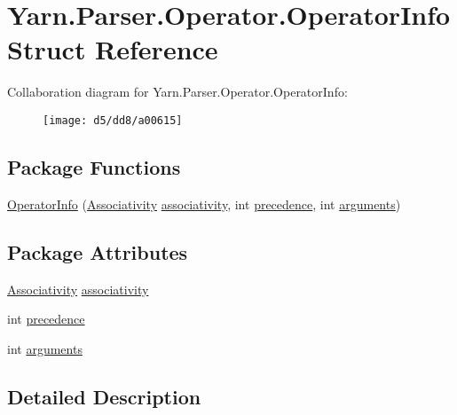 \hypertarget{a00118}{\section{Yarn.\-Parser.\-Operator.\-Operator\-Info Struct Reference}
\label{a00118}
}


Collaboration diagram for Yarn.\-Parser.\-Operator.\-Operator\-Info\-:
\nopagebreak
\begin{figure}[H]
\begin{center}
\leavevmode
\texttt{[image: d5/dd8/a00615]}
\end{center}
\end{figure}
\subsection*{Package Functions}
\begin{DoxyCompactItemize}
\item 
\hyperlink{a00118_a25faca62235c9f8542e4a071ba8ebc0b}{Operator\-Info} (\hyperlink{a00117_a83fa1b8db0e6678006920812b6f33f62}{Associativity} \hyperlink{a00118_accba40a72d9709ca3c18810b8661afe3}{associativity}, int \hyperlink{a00118_a0b2921d7b863e268d33aa15213395093}{precedence}, int \hyperlink{a00118_a0758c6f7dac4b205f616b43b1af95b95}{arguments})
\end{DoxyCompactItemize}
\subsection*{Package Attributes}
\begin{DoxyCompactItemize}
\item 
\hyperlink{a00117_a83fa1b8db0e6678006920812b6f33f62}{Associativity} \hyperlink{a00118_accba40a72d9709ca3c18810b8661afe3}{associativity}
\item 
int \hyperlink{a00118_a0b2921d7b863e268d33aa15213395093}{precedence}
\item 
int \hyperlink{a00118_a0758c6f7dac4b205f616b43b1af95b95}{arguments}
\end{DoxyCompactItemize}


\subsection{Detailed Description}


